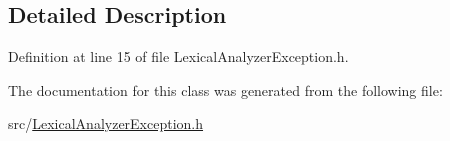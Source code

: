 \subsection{Detailed Description}


Definition at line 15 of file Lexical\+Analyzer\+Exception.\+h.



The documentation for this class was generated from the following file\+:\begin{DoxyCompactItemize}
\item 
src/\hyperlink{_lexical_analyzer_exception_8h}{Lexical\+Analyzer\+Exception.\+h}\end{DoxyCompactItemize}
